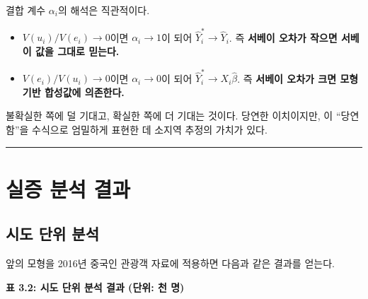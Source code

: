 \documentclass[
  letterpaper,
  DIV=11,
  numbers=noendperiod]{scrreprt}
\providecommand{\tightlist}{%
  \setlength{\itemsep}{0pt}\setlength{\parskip}{0pt}}
\begin{document}
결합 계수 \(\alpha_i\)의 해석은 직관적이다.

\begin{itemize}
\tightlist
\item
  \(V(u_i)/V(e_i) \to 0\)이면 \(\alpha_i \to 1\)이 되어
  \(\hat{Y}_i^* \to \hat{Y}_i\). 즉 \textbf{서베이 오차가 작으면 서베이
  값을 그대로 믿는다.}
\item
  \(V(e_i)/V(u_i) \to 0\)이면 \(\alpha_i \to 0\)이 되어
  \(\hat{Y}_i^* \to X_i \hat{\beta}\). 즉 \textbf{서베이 오차가 크면
  모형 기반 합성값에 의존한다.}
\end{itemize}

불확실한 쪽에 덜 기대고, 확실한 쪽에 더 기대는 것이다. 당연한
이치이지만, 이 ``당연함''을 수식으로 엄밀하게 표현한 데 소지역 추정의
가치가 있다.

\begin{center}\rule{0.5\linewidth}{0.5pt}\end{center}

\section{실증 분석 결과}\label{uxc2e4uxc99d-uxbd84uxc11d-uxacb0uxacfc-1}

\subsection{시도 단위
분석}\label{uxc2dcuxb3c4-uxb2e8uxc704-uxbd84uxc11d}

앞의 모형을 2016년 중국인 관광객 자료에 적용하면 다음과 같은 결과를
얻는다.

\textbf{표 3.2: 시도 단위 분석 결과 (단위: 천 명)}
\end{document}
